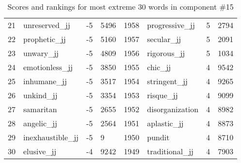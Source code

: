 \begin{table}[tbp]
\begin{tabular}{| rlr@{.}l | rlr@{.}l |}
    21 & unreserved\_jj & -5 & 5496    &    1958 & progressive\_jj & 5 & 2794 \\
    22 & prophetic\_jj & -5 & 5160    &    1957 & secular\_jj & 5 & 2091 \\
    23 & unwary\_jj & -5 & 4809    &    1956 & rigorous\_jj & 5 & 1034 \\
    24 & emotionless\_jj & -5 & 3850    &    1955 & chic\_jj & 4 & 9542 \\
    25 & inhumane\_jj & -5 & 3517    &    1954 & stringent\_jj & 4 & 9265 \\
    26 & unkind\_jj & -5 & 3354    &    1953 & risque\_jj & 4 & 9099 \\
    27 & samaritan & -5 & 2655    &    1952 & disorganization & 4 & 8982 \\
    28 & angelic\_jj & -5 & 2564    &    1951 & aplastic\_jj & 4 & 8873 \\
    29 & inexhaustible\_jj & -5 & 9    &    1950 & pundit & 4 & 8710 \\
    30 & elusive\_jj & -4 & 9242    &    1949 & traditional\_jj & 4 & 7903 \\
    \hline
    \end{tabular}
    \caption{Scores and rankings for most extreme 30 words in component \#15} 
\end{table}
\clearpage
